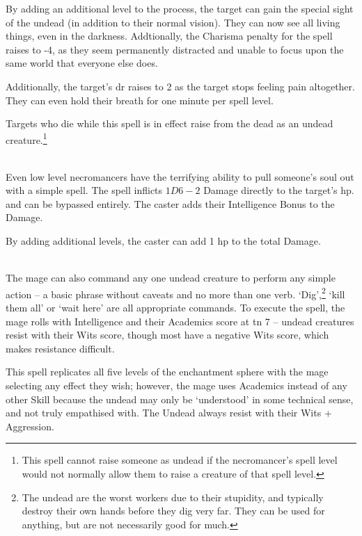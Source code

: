 \begin{multicols}{2}
By adding an additional level to the process, the target can gain the special sight of the undead (in addition to their normal vision).
They can now see all living things, even in the darkness.
Addtionally, the Charisma penalty for the spell raises to -4, as they seem permanently distracted and unable to focus upon the same world that everyone else does.

Additionally, the target's \gls{dr} raises to 2 as the target stops feeling pain altogether.  They can even hold their breath for one minute per spell level.

Targets who die while this spell is in effect raise from the dead as an undead creature.\footnote{This spell cannot raise someone as undead if the necromancer's spell level would not normally allow them to raise a creature of that spell level.}

\\
Even low level necromancers have the terrifying ability to pull someone's soul out with a simple spell.  The spell inflicts $1D6-2$ Damage directly to the target's \gls{hp}.   and  can be bypassed entirely.  The caster adds their Intelligence Bonus to the Damage.


By adding additional levels, the caster can add 1 \gls{hp} to the total Damage.

\\
The mage can also command any one undead creature to perform any simple action -- a basic phrase without caveats and no more than one verb.
`Dig',\footnote{The undead are the worst workers due to their stupidity, and typically destroy their own hands before they dig very far.
They can be used for anything, but are not necessarily good for much.}
`kill them all' or `wait here' are all appropriate commands.
To execute the spell, the mage rolls with Intelligence and their Academics score at \gls{tn} 7 -- undead creatures resist with their Wits score, though most have a negative Wits score, which makes resistance difficult.

This spell replicates all five levels of the enchantment sphere with the mage selecting any effect they wish; however, the mage uses Academics instead of any other Skill because the undead may only be `understood' in some technical sense, and not truly empathised with.
The Undead always resist with their Wits + Aggression.


\end{multicols}
